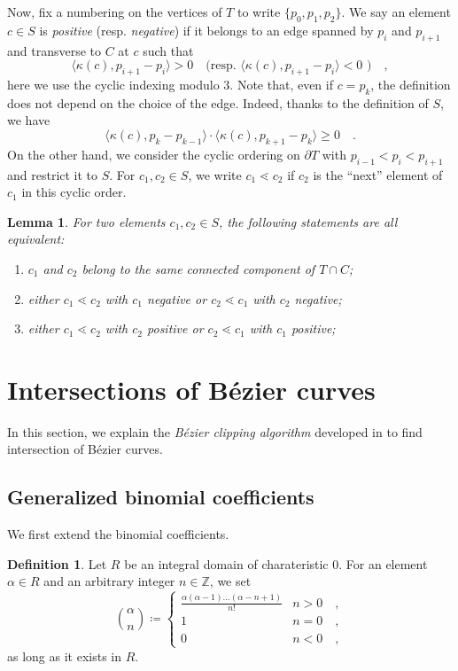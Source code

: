 \documentclass[pdftex,a4paper,12pt]{scrartcl}
\theoremstyle{plain}
\newtheorem{lemma}[theorem]{Lemma}
\theoremstyle{definition}
\newtheorem{definition}{Definition}
\theoremstyle{remark}
\numberwithin{equation}{section}
\begin{document}
Now, fix a numbering on the vertices of $T$ to write $\{p_0,p_1,p_2\}$.
We say an element $c\in S$ is \emph{positive} (resp. \emph{negative}) if it belongs to an edge spanned by $p_i$ and $p_{i+1}$ and transverse to $C$ at $c$ such that
\[
\langle\kappa(c),p_{i+1}-p_i\rangle > 0
\quad\text{(resp. } \langle\kappa(c),p_{i+1}-p_i\rangle < 0\text{ )}
\quad,
\]
here we use the cyclic indexing modulo $3$.
Note that, even if $c=p_k$, the definition does not depend on the choice of the edge.
Indeed, thanks to the definition of $S$, we have
\[
\langle\kappa(c),p_k-p_{k-1}\rangle\cdot\langle\kappa(c),p_{k+1}-p_k\rangle\ge 0
\quad.
\]
On the other hand, we consider the cyclic ordering on $\partial T$ with $p_{i-1}<p_i<p_{i+1}$ and restrict it to $S$.
For $c_1,c_2\in S$, we write $c_1\lessdot c_2$ if $c_2$ is the ``next'' element of $c_1$ in this cyclic order.

\begin{lemma}
For two elements $c_1,c_2\in S$, the following statements are all equivalent:
\begin{enumerate}[label=\upshape(\alph*)]
  \item $c_1$ and $c_2$ belong to the same connected component of $T\cap C$;
  \item either $c_1\lessdot c_2$ with $c_1$ negative or $c_2\lessdot c_1$ with $c_2$ negative;
  \item either $c_1\lessdot c_2$ with $c_2$ positive or $c_2\lessdot c_1$ with $c_1$ positive;
\end{enumerate}
\end{lemma}


\section{Intersections of B\'ezier curves}

In this section, we explain the \emph{B\'ezier clipping algorithm} developed in \cite{NishitaTakitaNakamae1992} to find intersection of B\'ezier curves.

\subsection{Generalized binomial coefficients}

We first extend the binomial coefficients.

\begin{definition}
Let $R$ be an integral domain of charateristic $0$.
For an element $\alpha\in R$ and an arbitrary integer $n\in\mathbb Z$, we set
\[
\binom{\alpha}{n}
\coloneqq
\begin{cases}
\displaystyle\frac{\alpha(\alpha-1)\dots(\alpha-n+1)}{n!} & n> 0\quad, \\
1 & n = 0\quad, \\
0 & n < 0 \quad,
\end{cases}
\]
as long as it exists in $R$.
\end{definition}
\end{document}
